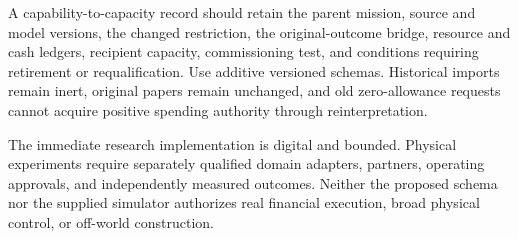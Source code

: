\documentclass[11pt,letterpaper]{article}
\newcommand{\1}{\mathbf 1}
\theoremstyle{remark}\newtheorem{remark}{Remark}[section]
\begin{document}
A capability-to-capacity record should retain the parent mission, source and model versions, the changed restriction, the original-outcome bridge, resource and cash ledgers, recipient capacity, commissioning test, and conditions requiring retirement or requalification. Use additive versioned schemas. Historical imports remain inert, original papers remain unchanged, and old zero-allowance requests cannot acquire positive spending authority through reinterpretation.

The immediate research implementation is digital and bounded. Physical experiments require separately qualified domain adapters, partners, operating approvals, and independently measured outcomes. Neither the proposed schema nor the supplied simulator authorizes real financial execution, broad physical control, or off-world construction.
\end{document}
